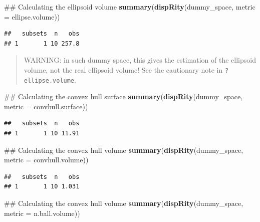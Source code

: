 \documentclass[]{book}
\newenvironment{Shaded}{\begin{snugshade}}{\end{snugshade}}
\newcommand{\KeywordTok}[1]{\textcolor[rgb]{0.13,0.29,0.53}{\textbf{#1}}}
\newcommand{\DataTypeTok}[1]{\textcolor[rgb]{0.13,0.29,0.53}{#1}}
\newcommand{\NormalTok}[1]{#1}
\theoremstyle{definition}
\theoremstyle{definition}
\theoremstyle{definition}
\theoremstyle{remark}
\begin{document}
\begin{Shaded}
\begin{Highlighting}[]
\NormalTok{## Calculating the ellipsoid volume}
\KeywordTok{summary}\NormalTok{(}\KeywordTok{dispRity}\NormalTok{(dummy_space, }\DataTypeTok{metric =}\NormalTok{ ellipse.volume))}
\end{Highlighting}
\end{Shaded}

\begin{verbatim}
##   subsets  n   obs
## 1       1 10 257.8
\end{verbatim}

\begin{quote}
WARNING: in such dummy space, this gives the estimation of the ellipsoid
volume, not the real ellipsoid volume! See the cautionary note in
\texttt{?ellipse.volume}.
\end{quote}

\begin{Shaded}
\begin{Highlighting}[]
\NormalTok{## Calculating the convex hull surface}
\KeywordTok{summary}\NormalTok{(}\KeywordTok{dispRity}\NormalTok{(dummy_space, }\DataTypeTok{metric =}\NormalTok{ convhull.surface))}
\end{Highlighting}
\end{Shaded}

\begin{verbatim}
##   subsets  n   obs
## 1       1 10 11.91
\end{verbatim}

\begin{Shaded}
\begin{Highlighting}[]
\NormalTok{## Calculating the convex hull volume}
\KeywordTok{summary}\NormalTok{(}\KeywordTok{dispRity}\NormalTok{(dummy_space, }\DataTypeTok{metric =}\NormalTok{ convhull.volume))}
\end{Highlighting}
\end{Shaded}

\begin{verbatim}
##   subsets  n   obs
## 1       1 10 1.031
\end{verbatim}

\begin{Shaded}
\begin{Highlighting}[]
\NormalTok{## Calculating the convex hull volume}
\KeywordTok{summary}\NormalTok{(}\KeywordTok{dispRity}\NormalTok{(dummy_space, }\DataTypeTok{metric =}\NormalTok{ n.ball.volume))}
\end{Highlighting}
\end{Shaded}
\end{document}
